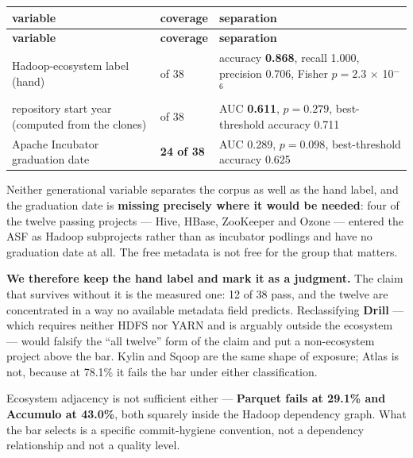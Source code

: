 \documentclass[11pt,a4paper]{article}
\begin{document}
\begingroup\footnotesize\setlength{\tabcolsep}{3pt}
\begin{longtable}{>{\raggedright\arraybackslash}p{}>{\raggedright\arraybackslash}p{}>{\raggedright\arraybackslash}p{}}
\toprule
\textbf{variable} & \textbf{coverage} & \textbf{separation} \\
\midrule
\endfirsthead
\toprule
\textbf{variable} & \textbf{coverage} & \textbf{separation} \\
\midrule
\endhead
\bottomrule
\endlastfoot
Hadoop-\allowbreak{}ecosystem label (hand) & 38 of 38 & accuracy \textbf{0.868}, recall 1.000, precision 0.706, Fisher $p = 2.3$ $\times$ 10$^{-\allowbreak{}}$$^{6}$ \\
repository start year (computed from the clones) & 38 of 38 & AUC \textbf{0.611}, $p = 0.279$, best-\allowbreak{}threshold accuracy 0.711 \\
Apache Incubator graduation date & \textbf{24 of 38} & AUC 0.289, $p = 0.098$, best-\allowbreak{}threshold accuracy 0.625 \\
\end{longtable}
\addtocounter{table}{-1}
\endgroup

Neither generational variable separates the corpus as well as the hand label, and the graduation date is \textbf{missing precisely where it would be needed}: four of the twelve passing projects --- Hive, HBase, ZooKeeper and Ozone --- entered the ASF as Hadoop subprojects rather than as incubator podlings and have no graduation date at all. The free metadata is not free for the group that matters.

\textbf{We therefore keep the hand label and mark it as a judgment.} The claim that survives without it is the measured one: 12 of 38 pass, and the twelve are concentrated in a way no available metadata field predicts. Reclassifying \textbf{Drill} --- which requires neither HDFS nor YARN and is arguably outside the ecosystem --- would falsify the ``all twelve'' form of the claim and put a non-ecosystem project above the bar. Kylin and Sqoop are the same shape of exposure; Atlas is not, because at 78.1\% it fails the bar under either classification.

Ecosystem adjacency is not sufficient either --- \textbf{Parquet fails at 29.1\% and Accumulo at 43.0\%}, both squarely inside the Hadoop dependency graph. What the bar selects is a specific commit-hygiene convention, not a dependency relationship and not a quality level.
\end{document}
